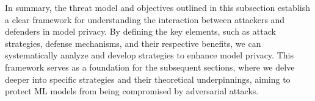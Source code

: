     In summary, the threat model and objectives outlined in this subsection establish a clear framework for understanding the interaction between attackers and defenders in model privacy. By defining the key elements, such as attack strategies, defense mechanisms, and their respective benefits, we can systematically analyze and develop strategies to enhance model privacy. This framework serves as a foundation for the subsequent sections, where we delve deeper into specific strategies and their theoretical underpinnings, aiming to protect ML models from being compromised by adversarial attacks.
        



